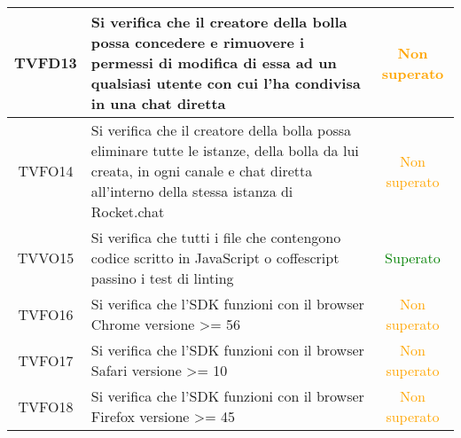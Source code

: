 \begin{center}
\begin{longtable}{|c|>{\centering}m{10cm}|c|}
		TVFD13 & Si verifica che il creatore della bolla possa concedere e rimuovere i permessi di modifica di essa ad un qualsiasi utente con cui l'ha condivisa in una chat diretta & \textcolor{Orange}{Non superato}\\ \hline
		TVFO14 & Si verifica che il creatore della bolla possa eliminare tutte le istanze, della bolla da lui creata, in ogni canale e chat diretta all'interno della stessa istanza di Rocket.chat & \textcolor{Orange}{Non superato}\\ \hline
		TVVO15 & Si verifica che tutti i file che contengono codice scritto in JavaScript o coffescript passino i test di linting & \textcolor{Green}{Superato}\\ \hline
		TVFO16 & Si verifica che l'SDK funzioni con il browser Chrome versione >= 56 & \textcolor{Orange}{Non superato}\\ \hline
		TVFO17 & Si verifica che l'SDK funzioni con il browser Safari versione >= 10 & \textcolor{Orange}{Non superato}\\ \hline
		TVFO18 & Si verifica che l'SDK funzioni con il browser Firefox versione >= 45 & \textcolor{Orange}{Non superato}\\ \hline
	\end{longtable}
\end{center}
